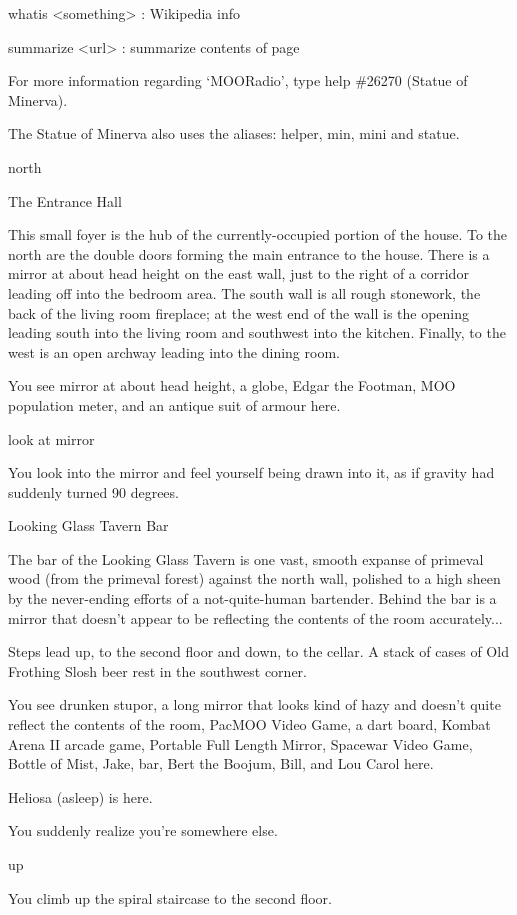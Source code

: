 \documentclass[10pt,twoside,openleft]{memoir}
\begin{document}
{whatis <something> : Wikipedia info

summarize <url> : summarize contents of page

For more information regarding `MOORadio', type help \#26270  (Statue of Minerva).

The Statue of Minerva also uses the aliases: helper, min, mini and statue.

north

The Entrance Hall

This small foyer is the hub of the currently-occupied portion of the house.  To the north are the double doors forming the main entrance to the house.  There is a mirror at about head height on the east wall, just to the right of a corridor leading off into the bedroom area.  The south wall is all rough stonework, the back of the living room fireplace; at the west end of the wall is the opening leading south into the living room and southwest into the kitchen.  Finally, to the west is an open archway leading into the dining room.

You see mirror at about head height, a globe, Edgar the Footman, MOO population meter, and an antique suit of armour here.

look at mirror

You look into the mirror and feel yourself being drawn into it, as if gravity had suddenly turned 90 degrees.

Looking Glass Tavern Bar

The bar of the Looking Glass Tavern is one vast, smooth expanse of primeval wood (from the primeval forest) against the north wall, polished to a high sheen by the never-ending efforts of a not-quite-human bartender.  Behind the bar is a mirror that doesn't appear to be reflecting the contents of the room accurately...

Steps lead up, to the second floor and down, to the cellar.  A stack of cases of Old Frothing Slosh beer rest in the southwest corner.

You see drunken stupor, a long mirror that looks kind of hazy and doesn't quite reflect the contents of the room, PacMOO Video Game, a dart board, Kombat Arena II arcade game, Portable Full Length Mirror, Spacewar Video Game, Bottle of Mist, Jake, bar, Bert the Boojum, Bill, and Lou Carol here.

Heliosa (asleep) is here.

You suddenly realize you're somewhere else.

up

You climb up the spiral staircase to the second floor.

}
\end{document}
